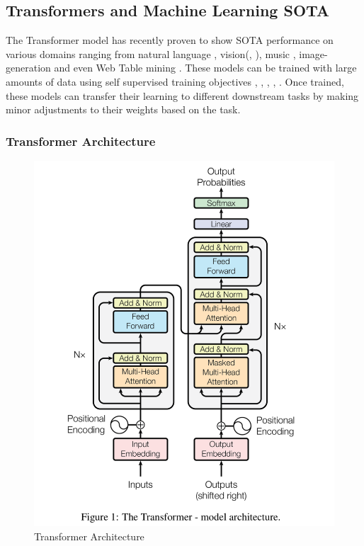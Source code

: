 \subsection{Transformers and Machine Learning SOTA}
The Transformer model \parencite{vaswani2017attention} has recently proven to show SOTA performance on various domains ranging from natural language \parencite{brown2020language}, vision(\cite{radford2021learning}, \cite{dosovitskiy2020image}), music \parencite{huang2018music}, image-generation \parencite{ramesh2021zero} and even Web Table mining \parencite{deng2020turl}. These models can be trained with large amounts of data using self supervised training objectives \parencite{chen2020big}, \parencite{kolesnikov2019revisiting}, \parencite{goyal2019scaling}, \parencite{gidaris2018unsupervised}, \parencite{doersch2015unsupervised}. Once trained, these models can transfer their learning to different downstream tasks by making minor adjustments to their weights \parencite{howard2018universal} based on the task.  

\subsubsection{Transformer Architecture}
\begin{figure}[h]
    \centering
    \includegraphics[width=0.7\maxwidth{\textwidth}]{src/images/transformer.png}
    \caption{Transformer Architecture}
    \label{figure\arabic{figurecounter}}
\end{figure}

